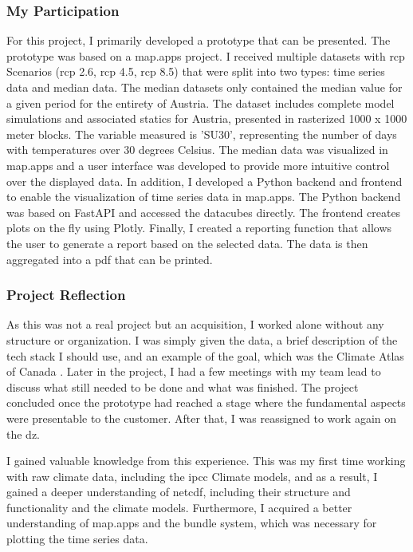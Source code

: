 \documentclass[11pt, titlepage, a4paper]{article}
\begin{document}
\subsubsection{My Participation}
For this project, I primarily developed a prototype that can be presented. The prototype was based on a map.apps project.    I received multiple datasets with \gls{rcp} Scenarios (\gls{rcp} 2.6, \gls{rcp} 4.5, \gls{rcp} 8.5) \cite{intergovernmentalpanelonclimatechangeClimateChange2023} that were split into two types: time series data and median data. The median datasets only contained the median value for a given period for the entirety of Austria. The dataset includes complete model simulations and associated statics for Austria, presented in rasterized 1000 x 1000 meter blocks. The variable measured is 'SU30', representing the number of days with temperatures over 30 degrees Celsius.
The median data was visualized in map.apps and a user interface was developed to provide more intuitive control over the displayed data. In addition, I developed a Python backend and frontend to enable the visualization of time series data in map.apps. The Python backend was based on FastAPI and accessed the datacubes directly. The frontend creates plots on the fly using Plotly. Finally, I created a reporting function that allows the user to generate a report based on the selected data. The data is then aggregated into a \gls{pdf} that can be printed.

\subsubsection{Project Reflection}
As this was not a real project but an acquisition, I worked alone without any structure or organization.  I was simply given the data, a brief description of the tech stack I should use, and an example of the goal, which was the Climate Atlas of Canada \cite{ClimateAtlasCanada}. Later in the project, I had a few meetings with my team lead to discuss what still needed to be done and what was finished. The project concluded once the prototype had reached a stage where the fundamental aspects were presentable to the customer. After that, I was reassigned to work again on the \gls{dz}.

I gained valuable knowledge from this experience. This was my first time working with raw climate data, including the \gls{ipcc} Climate models, and as a result, I gained a deeper understanding of \gls{netcdf}, including their structure and functionality and the climate models. Furthermore, I acquired a better understanding of map.apps and the bundle system, which was necessary for plotting the time series data.
\end{document}
